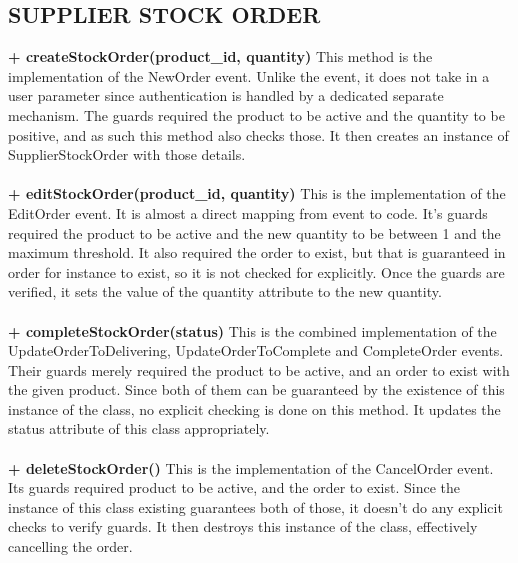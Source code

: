 \documentclass[a4paper]{article}
\begin{document}
\subsection{SUPPLIER STOCK ORDER}
{\bf + createStockOrder(product\_id, quantity)}
This method is the implementation of the NewOrder event. Unlike the event, it does not take in a user parameter since authentication is handled by a dedicated separate mechanism. The guards required the product to be active and the quantity to be positive, and as such this method also checks those. It then creates an instance of SupplierStockOrder with those details.
\\\\
{\bf + editStockOrder(product\_id, quantity)}
This is the implementation of the EditOrder event. It is almost a direct mapping from event to code. It’s guards required the product to be active and the new quantity to be between 1 and the maximum threshold. It also required the order to exist, but that is guaranteed in order for instance to exist, so it is not checked for explicitly. Once the guards are verified, it sets the value of the quantity attribute to the new quantity. 
\\\\
{\bf + completeStockOrder(status)}
This is the combined implementation of the UpdateOrderToDelivering, UpdateOrderToComplete and CompleteOrder events. Their guards merely required the product to be active, and an order to exist with the given product. Since both of them can be guaranteed by the existence of this instance of the class, no explicit checking is done on this method. It updates the status attribute of this class appropriately.
\\\\
{\bf + deleteStockOrder()}
This is the implementation of the CancelOrder event. Its guards required product to be active, and the order to exist. Since the instance of this class existing guarantees both of those, it doesn’t do any explicit checks to verify guards. It then destroys this instance of the class, effectively cancelling the order.
\\\\
\end{document}
